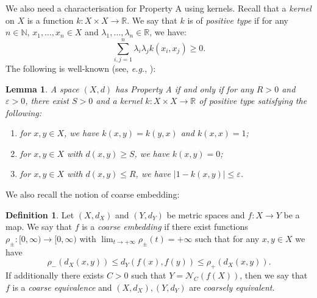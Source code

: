 \documentclass[12pt, a4paper]{amsart}
\numberwithin{equation}{section}
\newtheorem{lem}[thm]{Lemma}
\theoremstyle{definition}
\newtheorem{defn}[thm]{Definition}
\theoremstyle{remark}
\def\NN{\mathbb{N}}
\def\RR{\mathbb{R}}
\def\Nd{\mathcal{N}}
\begin{document}

We also need a characterisation for Property A using kernels. Recall that a \emph{kernel} on $X$ is a function $k\colon X\times X\rightarrow\RR$. We say that $k$ is of \textit{positive type} if for any $n\in\NN$, $x_{1},\ldots,x_{n}\in X$ and $\lambda_1,\ldots,\lambda_{n}\in\RR$, we have:
\[
    \sum_{i,j=1}^{n}\lambda_{i}\lambda_{j}k(x_{i},x_{j})\geq 0.
\]
The following is well-known (see, \emph{e.g.}, \cite[Proposition 1.2.4]{Wil09}):

\begin{lem}\label{lem:char for A}
A space $(X,d)$ has \textit{Property A} if and only if for any $R>0$ and $\varepsilon>0$, there exist $S>0$ and a kernel $k: X \times X \to \RR$ of positive type satisfying the following:
\begin{enumerate}
 \item for $x,y\in X$, we have $k(x,y)=k(y,x)$ and $k(x,x) =1$;
 \item for $x,y\in X$ with $d(x,y) \geq S$, we have $k(x,y)=0$;
 \item for $x,y\in X$ with $d(x,y) \leq R$, we have $|1-k(x,y)| \leq \varepsilon$.
\end{enumerate}
\end{lem}

We also recall the notion of coarse embedding:

\begin{defn}\label{defn: coarse equivalence}
Let $(X,d_X)$ and $(Y,d_Y)$ be metric spaces and $f: X \to Y$ be a map. We say that $f$ is a \emph{coarse embedding} if there exist functions $\rho_{\pm}: [0,\infty) \to [0,\infty)$ with $\lim_{t\to +\infty}\rho_{\pm}(t) = +\infty$ such that for any $x,y\in X$ we have
\[
\rho_-(d_X(x,y)) \leq d_Y(f(x),f(y)) \leq \rho_+(d_X(x,y)).
\]
If additionally there exists $C>0$ such that $Y=\Nd_C(f(X))$, then we say that $f$ is a \emph{coarse equivalence} and $(X,d_X), (Y,d_Y)$ are \emph{coarsely equivalent}.
\end{defn}
\end{document}
